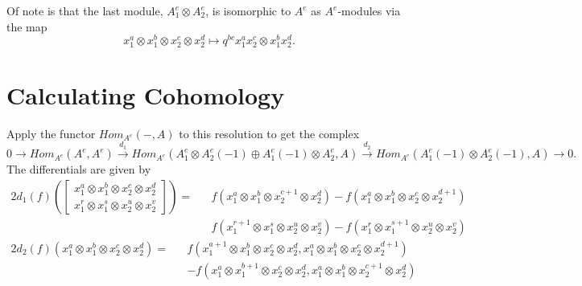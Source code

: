 \documentclass[12pt,a4paper]{article}
\newcommand\1{_{(1)}}
\newcommand\2{_{(2)}}
\begin{document}
Of note is that the last module, $A_1^e\otimes A_2^e$, is isomorphic to $A^e$ as $A^e$-modules via the map
\[
x_1^a\otimes x_1^b\otimes x_2^c\otimes x_2^d\mapsto q^{bc} x_1^ax_2^c\otimes x_1^bx_2^d.  
\]

\section{Calculating Cohomology}
Apply the functor $Hom_{A^e}(-,A)$ to this resolution to get the complex
\[
0\to Hom_{A^e}(A^e,A^e)\xrightarrow{d_1} Hom_{A^e}(A_1^e\otimes A_2^e(-1)\oplus A_1^e(-1)\otimes A_2^e,A)\xrightarrow{d_2}Hom_{A^e}(A_1^e(-1)\otimes A_2^e(-1),A)\to 0.  
\]
The differentials are given by
\begin{alignat*}{2}
  d_1(f)\left(\begin{bmatrix}x_1^a\otimes x_1^b\otimes x_2^c\otimes x_2^d\\ x_1^r\otimes x_1^s\otimes x_2^u\otimes x_2^v\end{bmatrix}\right)= &&f(x_1^a\otimes x_1^b\otimes x_2^{c+1}\otimes x_2^d)-f(x_1^a\otimes x_1^b\otimes x_2^c\otimes x_2^{d+1})\\
  && f(x_1^{r+1}\otimes x_1^s\otimes  x_2^u\otimes x_2^v)-f(x_1^r\otimes x_1^{s+1}\otimes x_2^u\otimes x_2^v)
\end{alignat*}  
\begin{alignat*}{2}
  d_2(f)(x_1^a\otimes x_1^b\otimes x_2^c\otimes x_2^d)=&&f(x_1^{a+1}\otimes x_1^b\otimes x_2^c\otimes x_2^d,x_1^a\otimes x_1^b\otimes x_2^c\otimes x_2^{d+1})\\
  &&-f(x_1^a\otimes x_1^{b+1}\otimes x_2^c\otimes x_2^d,x_1^a\otimes x_1^b\otimes x_2^{c+1}\otimes x_2^d)
\end{alignat*}
\end{document}
